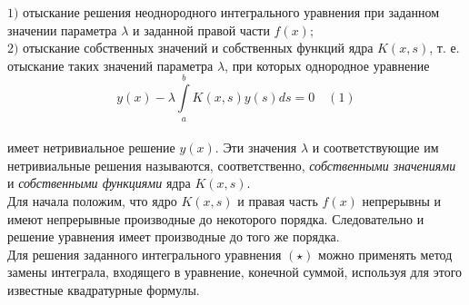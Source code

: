 \documentclass[12pt]{article}
\begin{document}
$ 1) $ отыскание решения неоднородного интегрального уравнения при заданном значении параметра $ \lambda $ и заданной правой части $ f(x) $;\\

$ 2) $ отыскание собственных значений и собственных функций ядра $ K(x, s) $, т. е. отыскание таких значений параметра $ \lambda $, при которых однородное уравнение\\
$$ y(x) - \lambda \int\limits_a^b K(x, s) y(s) ds = 0  \quad (1)$$ \\
имеет нетривиальное решение $ y(x) $. Эти значения $ \lambda $ и соответствующие им нетривиальные решения называются, соответственно, \textit{собственными значениями} и \textit{собственными функциями} ядра $ K(x,s) $. \\

Для начала положим, что ядро $ K(x,s) $ и правая часть $ f(x) $ непрерывны и имеют непрерывные производные до некоторого порядка. Следовательно и решение уравнения имеет производные до того же порядка.\\

Для решения заданного интегрального уравнения $ (\star) $ можно применять метод замены интеграла, входящего в уравнение, конечной суммой, используя для этого известные квадратурные формулы. \\
\end{document}
